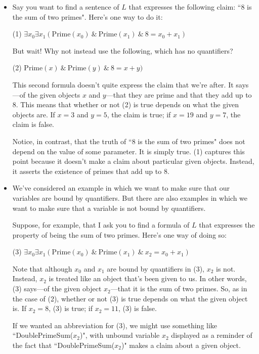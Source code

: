 \documentclass[12pt,a4paper]{article}
\begin{document}
\begin{itemize}

\item Say you want to find a sentence of $L$ that expresses the following claim: ``$8$ is the sum of two primes". Here's one way to do it:

(1) $\exists x_0 \exists x_1 (\text{Prime}(x_0) \ \& \ \text{Prime}(x_1) \ \& \ 8 = x_0 + x_1)$

But wait! Why not instead use the following, which has no quantifiers?

(2) $\text{Prime}(x) \ \& \ \text{Prime}(y) \ \& \ 8 = x + y)$

This second formula doesn't quite express the claim that we're after. It says---of the given objects $x$ and $y$---that they are prime and that they add up to 8. This means that whether or not (2) is true depends on what the given objects are. If $x = 3$ and $y = 5$, the claim is true; if $x = 19$ and $y = 7$, the claim is false.

Notice, in contrast, that the truth of ``$8$ is the sum of two primes" does not depend on the value of some parameter. It is simply true. (1) captures this point because it doesn't make a claim about particular given objects. Instead, it asserts the existence of primes that add up to $8$.

\item We've considered an example in which we want to make sure that our variables are bound by quantifiers. But there are also examples in which we want to make sure that a variable is not bound by quantifiers.

Suppose, for example, that I ask you to find a formula of $L$ that expresses the property of being the sum of two primes. Here's one way of doing so:

(3) $\exists x_0 \exists x_1 (\text{Prime}(x_0) \ \& \ \text{Prime}(x_1) \ \& \ x_2 = x_0 + x_1)$

Note that although $x_0$ and $x_1$ are bound by quantifiers in (3), $x_2$ is not. Instead, $x_2$ is treated like an object that's been given to us. In other words, (3) says---of the given object $x_2$---that it is the sum of two primes. So, as in the case of (2), whether or not (3) is true depends on what the given object is. If $x_2 = 8$, (3) is true; if $x_2 = 11$, (3) is false.

If we wanted an abbreviation for (3), we might use something like ``DoublePrimeSum($x_2$)", with unbound variable $x_2$ displayed as a reminder of the fact that ``DoublePrimeSum($x_2$)" makes a claim about a given object.


\end{itemize}
\end{document}
